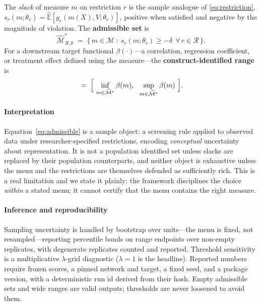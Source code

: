 \documentclass[11pt,letterpaper]{article}
\newcommand{\Mstar}{\widehat{\mathcal{M}}^{*}}
\begin{document}
The \emph{slack} of measure $m$ on restriction $r$ is the sample analogue of \eqref{eq:restriction},
$s_r(m;\theta_r) = \widehat{\mathbb{E}}[g_r(m(X),V;\theta_r)]$, positive when satisfied and negative by the
magnitude of violation. The \textbf{admissible set} is
\begin{equation}
  \Mstar_{\mathcal{R},\theta} \;=\; \bigl\{\, m \in \mathcal{M} \ :\ s_r(m;\theta_r) \ge -\delta
  \ \ \forall\, r \in \mathcal{R} \,\bigr\}.
  \label{eq:admissible}
\end{equation}
For a downstream target functional $\beta(\cdot)$---a correlation, regression coefficient, or treatment
effect defined using the measure---the \textbf{construct-identified range} is
\begin{equation}
  [\widehat L, \widehat U] \;=\;
  \Bigl[\ \inf_{m \in \Mstar} \beta(m),\ \ \sup_{m \in \Mstar} \beta(m)\ \Bigr].
  \label{eq:range}
\end{equation}

\paragraph{Interpretation} Equation~\eqref{eq:admissible} is a sample object: a screening rule applied to
observed data under researcher-specified restrictions, encoding \emph{conceptual} uncertainty about
representation. It is not a population identified set unless slacks are replaced by their population
counterparts, and neither object is exhaustive unless the menu and the restrictions are themselves defended
as sufficiently rich. This is a real limitation and we state it plainly: the framework disciplines the choice
\emph{within} a stated menu; it cannot certify that the menu contains the right measure.

\paragraph{Inference and reproducibility} Sampling uncertainty is handled by bootstrap over units---the menu
is fixed, not resampled---reporting percentile bands on range endpoints over non-empty replicates, with
degenerate replicates counted and reported. Threshold sensitivity is a multiplicative $\lambda$-grid
diagnostic ($\lambda=1$ is the headline). Reported numbers require frozen scores, a pinned network and target,
a fixed seed, and a package version, with a deterministic run id derived from their hash. Empty admissible
sets and wide ranges are valid outputs; thresholds are never loosened to avoid them.
\end{document}
